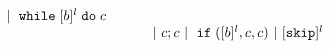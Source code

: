 \[\begin{array}{llll}
~|~ {\ewhile [ \bexpr ]^{l} \edo {c} }
 \\
 &&&
~|~ {c};{c}  
~|~ \eif([\bexpr]{}^l , {c}, {c}) 
~|~ [\eskip]^l 
%
%
\end{array}
\]
